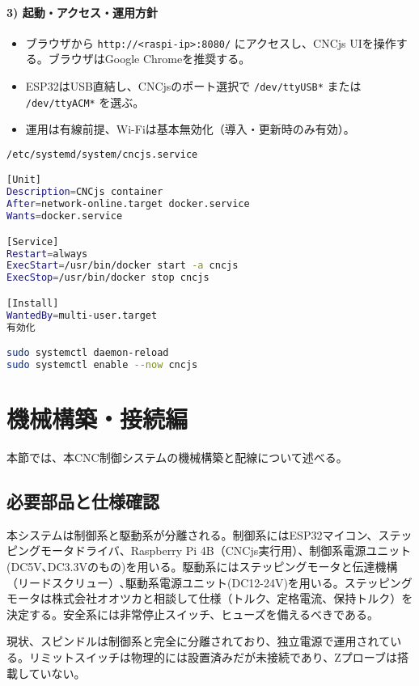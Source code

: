 \documentclass[uplatex,dvipdfmx]{ujarticle}
\begin{document}
\paragraph{3) 起動・アクセス・運用方針}
\begin{itemize}
\item ブラウザから \texttt{http://<raspi-ip>:8080/} にアクセスし、CNCjs UIを操作する。ブラウザはGoogle Chromeを推奨する。
\item ESP32はUSB直結し、CNCjsのポート選択で \texttt{/dev/ttyUSB*} または \texttt{/dev/ttyACM*} を選ぶ。
\item 運用は有線前提、Wi-Fiは基本無効化（導入・更新時のみ有効）。
\end{itemize}

\begin{lstlisting}[caption=systemdで自動起動（コンテナを常駐させる例）, label=code:systemd, language=bash]
/etc/systemd/system/cncjs.service

[Unit]
Description=CNCjs container
After=network-online.target docker.service
Wants=docker.service

[Service]
Restart=always
ExecStart=/usr/bin/docker start -a cncjs
ExecStop=/usr/bin/docker stop cncjs

[Install]
WantedBy=multi-user.target
有効化

sudo systemctl daemon-reload
sudo systemctl enable --now cncjs
\end{lstlisting}

\section{機械構築・接続編}

本節では、本CNC制御システムの機械構築と配線について述べる。


\subsection{必要部品と仕様確認}

本システムは制御系と駆動系が分離される。制御系にはESP32マイコン、ステッピングモータドライバ、Raspberry Pi 4B（CNCjs実行用）、制御系電源ユニット(DC5V､DC3.3Vのもの)を用いる。駆動系にはステッピングモータと伝達機構（リードスクリュー）､駆動系電源ユニット(DC12-24V)を用いる。ステッピングモータは株式会社オオツカと相談して仕様（トルク、定格電流、保持トルク）を決定する。安全系には非常停止スイッチ、ヒューズを備えるべきである。

現状、スピンドルは制御系と完全に分離されており、独立電源で運用されている。リミットスイッチは物理的には設置済みだが未接続であり、Zプローブは搭載していない。
\end{document}
